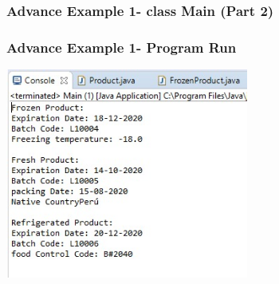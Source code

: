 \documentclass[11pt]{beamer}
\begin{document}
\begin{frame}
\frametitle{Advance Example 1- class Main (Part 2)}

\end{frame}

\begin{frame}
\frametitle{Advance Example  1- Program Run}
\begin{center}
{\includegraphics[width=8.0cm]{img/RunAdvanceExample1.png}}
\end{center}
\end{frame}
\end{document}
